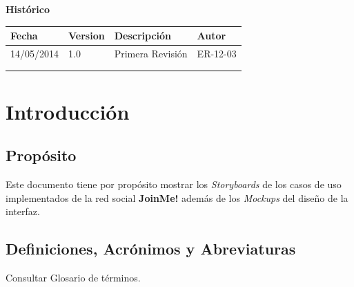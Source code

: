 \documentclass[12pt, a4paper, titlepage]{article}
\begin{document}
\begin{titlepage}
\vspace{2cm}

\begin{center}
	\large{\textbf{Histórico}}
	
    \begin{tabular}{ | p{4cm} | p{2cm} | p{6cm} | p{3cm} |}
    \hline
    \textbf{Fecha} & \textbf{Version} & \textbf{Descripción} & \textbf{Autor} \\ \hline
      14/05/2014 & 1.0 & Primera Revisión & ER-12-03\\ \hline
      &  &  & \\ \hline
     &  & &\\ \hline
    \end{tabular}
\end{center}


\end{titlepage}
\clearpage


\tableofcontents
\clearpage

\section{Introducción}

\subsection{Propósito}
Este documento tiene por propósito mostrar los \textit{Storyboards} de los casos de uso implementados de la red social \textbf{JoinMe!} además de los \textit{Mockups} del diseño de la interfaz.



\subsection{Definiciones, Acrónimos y Abreviaturas}

Consultar Glosario de términos.
\end{document}
